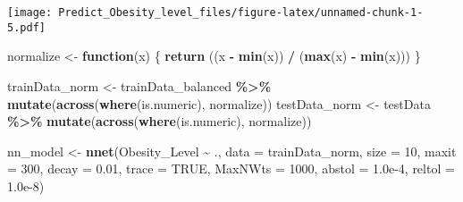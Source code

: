 \documentclass[
]{article}
\newenvironment{Shaded}{\begin{snugshade}}{\end{snugshade}}
\newcommand{\AttributeTok}[1]{\textcolor[rgb]{0.13,0.29,0.53}{#1}}
\newcommand{\ConstantTok}[1]{\textcolor[rgb]{0.56,0.35,0.01}{#1}}
\newcommand{\ControlFlowTok}[1]{\textcolor[rgb]{0.13,0.29,0.53}{\textbf{#1}}}
\newcommand{\DecValTok}[1]{\textcolor[rgb]{0.00,0.00,0.81}{#1}}
\newcommand{\FloatTok}[1]{\textcolor[rgb]{0.00,0.00,0.81}{#1}}
\newcommand{\FunctionTok}[1]{\textcolor[rgb]{0.13,0.29,0.53}{\textbf{#1}}}
\newcommand{\NormalTok}[1]{#1}
\newcommand{\OtherTok}[1]{\textcolor[rgb]{0.56,0.35,0.01}{#1}}
\newcommand{\SpecialCharTok}[1]{\textcolor[rgb]{0.81,0.36,0.00}{\textbf{#1}}}
\newcommand{\StringTok}[1]{\textcolor[rgb]{0.31,0.60,0.02}{#1}}
\begin{document}
\begin{Shaded}
\end{Shaded}

\texttt{[image: Predict\_Obesity\_level\_files/figure-latex/unnamed-chunk-1-5.pdf]}

\begin{Shaded}
\begin{Highlighting}[]
\NormalTok{normalize }\OtherTok{\textless{}{-}} \ControlFlowTok{function}\NormalTok{(x) \{}
    \FunctionTok{return}\NormalTok{ ((x }\SpecialCharTok{{-}} \FunctionTok{min}\NormalTok{(x)) }\SpecialCharTok{/}\NormalTok{ (}\FunctionTok{max}\NormalTok{(x) }\SpecialCharTok{{-}} \FunctionTok{min}\NormalTok{(x)))}
\NormalTok{\}}
         
\NormalTok{trainData\_norm }\OtherTok{\textless{}{-}}\NormalTok{ trainData\_balanced }\SpecialCharTok{\%\textgreater{}\%}
    \FunctionTok{mutate}\NormalTok{(}\FunctionTok{across}\NormalTok{(}\FunctionTok{where}\NormalTok{(is.numeric), normalize))}
\NormalTok{    testData\_norm }\OtherTok{\textless{}{-}}\NormalTok{ testData }\SpecialCharTok{\%\textgreater{}\%}
    \FunctionTok{mutate}\NormalTok{(}\FunctionTok{across}\NormalTok{(}\FunctionTok{where}\NormalTok{(is.numeric), normalize))}
         

\NormalTok{nn\_model }\OtherTok{\textless{}{-}} \FunctionTok{nnet}\NormalTok{(Obesity\_Level }\SpecialCharTok{\textasciitilde{}}\NormalTok{ ., }\AttributeTok{data =}\NormalTok{ trainData\_norm, }\AttributeTok{size =} \DecValTok{10}\NormalTok{, }\AttributeTok{maxit =} \DecValTok{300}\NormalTok{, }\AttributeTok{decay =} \FloatTok{0.01}\NormalTok{, }
    \AttributeTok{trace =} \ConstantTok{TRUE}\NormalTok{, }\AttributeTok{MaxNWts =} \DecValTok{1000}\NormalTok{, }\AttributeTok{abstol =} \FloatTok{1.0e{-}4}\NormalTok{, }\AttributeTok{reltol =} \FloatTok{1.0e{-}8}\NormalTok{)}
\end{Highlighting}
\end{Shaded}
\end{document}
